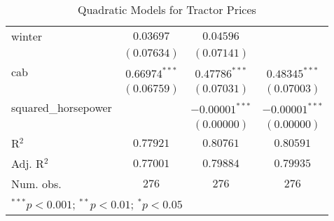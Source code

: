 \begin{table}
\begin{center}
\begin{tabular}{l c c c}
winter              & $0.03697$        & $0.04596$        &                  \\
                    & $(0.07634)$      & $(0.07141)$      &                  \\
cab                 & $0.66974^{***}$  & $0.47786^{***}$  & $0.48345^{***}$  \\
                    & $(0.06759)$      & $(0.07031)$      & $(0.07003)$      \\
squared\_horsepower &                  & $-0.00001^{***}$ & $-0.00001^{***}$ \\
                    &                  & $(0.00000)$      & $(0.00000)$      \\
\hline
R$^2$               & $0.77921$        & $0.80761$        & $0.80591$        \\
Adj. R$^2$          & $0.77001$        & $0.79884$        & $0.79935$        \\
Num. obs.           & $276$            & $276$            & $276$            \\
\hline
\multicolumn{4}{l}{\scriptsize{$^{***}p<0.001$; $^{**}p<0.01$; $^{*}p<0.05$}}
\end{tabular}
\caption{Quadratic Models for Tractor Prices}
\label{tab:reg_sq_horse}
\end{center}
\end{table}
